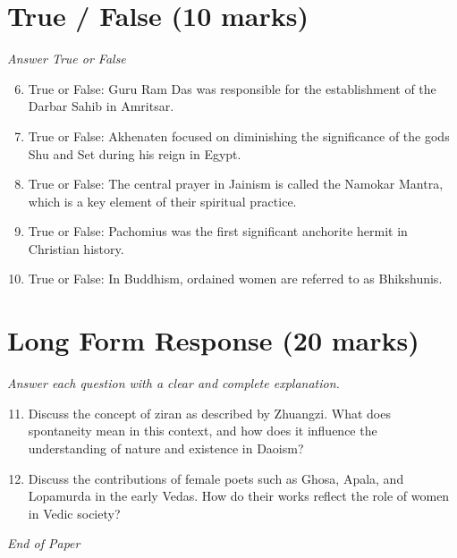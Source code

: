 \documentclass[12pt]{article}
\begin{document}
\section*{True / False (10 marks)}
\textit{Answer True or False}
\begin{enumerate}[label=\arabic*.]
\setcounter{enumi}{5}
\item True or False: Guru Ram Das was responsible for the establishment of the Darbar Sahib in Amritsar.
\item True or False: Akhenaten focused on diminishing the significance of the gods Shu and Set during his reign in Egypt.
\item True or False: The central prayer in Jainism is called the Namokar Mantra, which is a key element of their spiritual practice.
\item True or False: Pachomius was the first significant anchorite hermit in Christian history.
\item True or False: In Buddhism, ordained women are referred to as Bhikshunis.
\end{enumerate}

\section*{Long Form Response (20 marks)}
\textit{Answer each question with a clear and complete explanation.}
\begin{enumerate}[label=\arabic*.]
\setcounter{enumi}{10}
\item Discuss the concept of ziran as described by Zhuangzi. What does spontaneity mean in this context, and how does it influence the understanding of nature and existence in Daoism?
\item Discuss the contributions of female poets such as Ghosa, Apala, and Lopamurda in the early Vedas. How do their works reflect the role of women in Vedic society?
\end{enumerate}

\vfill
\noindent\textit{End of Paper}
\end{document}
